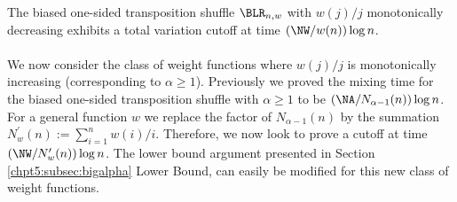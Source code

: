 \documentclass[11pt]{report}
\begin{document}
\begin{conj}
	The biased one-sided transposition shuffle $\BLR_{n,w}$ with $w(j)/j$ monotonically decreasing exhibits a total variation cutoff at time $\left(\NW /w(n) \right) \log n$. 
\end{conj}


\paragraph{}
We now consider the class of weight functions where $w(j)/j$ is monotonically increasing (corresponding to $\alpha \geq 1$). Previously we proved the mixing time for the biased one-sided transposition shuffle with $\alpha \geq 1$ to be $\left( \NA / N_{\alpha-1}(n) \right) \log n$. For a general function $w$ we replace the factor of $N_{\alpha-1}(n)$ by the summation $ N_{w}^{\prime}(n):= \sum_{i=1}^{n} w(i)/i$. Therefore, we now look to prove a cutoff at time $\left( \NW / N_{w}^{\prime}(n) \right) \log n$. The lower bound argument presented in Section \ref{chpt5:subsec:bigalpha} Lower Bound, can easily be modified for this new class of weight functions. 
\end{document}
